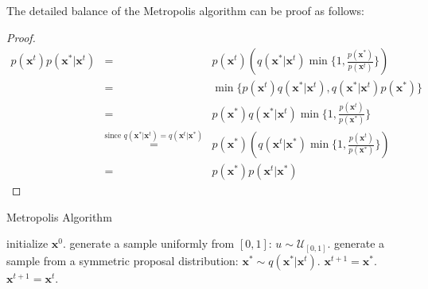 The detailed balance of the Metropolis algorithm can be proof as follows:
\begin{proof}
	\begin{equation}
		\begin{array}{rcl}
			p(\mathbf{x}^t)p(\mathbf{x}^*|\mathbf{x}^t)&=&p(\mathbf{x}^t)\left(q(\mathbf{x}^*|\mathbf{x}^t)\min\{1,\frac{p(\mathbf{x}^*)}{p(\mathbf{x}^t)}\}\right) \\
												       &=& \min\{p(\mathbf{x}^t)q(\mathbf{x}^*|\mathbf{x}^t),q(\mathbf{x}^*|\mathbf{x}^t)p(\mathbf{x}^*) \}  \\
			                                           &=&p(\mathbf{x}^*)q(\mathbf{x}^*|\mathbf{x}^t)\min\{1,\frac{p(\mathbf{x}^t)}{p(\mathbf{x}^*)}\} \\
																											 &\overset{\text{since } q(\mathbf{x}^*|\mathbf{x}^t)=q(\mathbf{x}^t|\mathbf{x}^*)}=& p(\mathbf{x}^*)\left(q(\mathbf{x}^t|\mathbf{x}^*) \min\{1,\frac{p(\mathbf{x}^t)}{p(\mathbf{x}^*)}\} \right) \\
																							  &=& p(\mathbf{x}^*)p(\mathbf{x}^t|\mathbf{x}^*)
	   \end{array}
	\end{equation}
\end{proof}

\begin{algorithm}[t]
	\caption{Metropolis Algorithm}
	\label{alg:LBP}
\begin{algorithmic}[1]
\STATE initialize $\mathbf{x}^0$.
\STATE generate a sample uniformly from $[0,1]$: $u\sim \mathcal{U}_{[0,1]}$.
\STATE generate a sample from a symmetric proposal distribution: $\mathbf{x}^*\sim q(\mathbf{x}^*|\mathbf{x}^t)$.
\STATE $\mathbf{x}^{t+1}=\mathbf{x}^*$.
\ELSE 
\STATE $\mathbf{x}^{t+1}=\mathbf{x}^t$.
\ENDIF
\ENDFOR
\end{algorithmic}
\end{algorithm}

